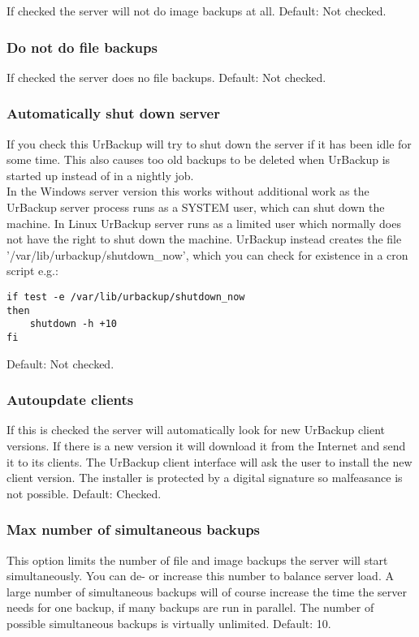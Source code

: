 \documentclass[a4paper,10pt]{article} \usepackage[breaklinks=true]{hyperref}
\begin{document}
If checked the server will not do image backups at all. Default: Not checked.

\subsubsection{Do not do file backups}

If checked the server does no file backups. Default: Not checked.

\subsubsection{Automatically shut down server}

If you check this UrBackup will try to shut down the server if it has been idle for some time. This also causes too old backups to be deleted when UrBackup is started up instead of in a nightly job.\\
In the Windows server version this works without additional work as the UrBackup
server process runs as a SYSTEM user, which can shut down the machine. In Linux
UrBackup server runs as a limited user which normally does not have the right to
shut down the machine. UrBackup instead creates the file
'/var/lib/urbackup/shutdown\_now', which you can check for existence in a cron
script e.g.:
\begin{verbatim}
if test -e /var/lib/urbackup/shutdown_now
then
	shutdown -h +10
fi
\end{verbatim}

Default: Not checked.

\subsubsection{Autoupdate clients}

If this is checked the server will automatically look for new UrBackup client
versions. If there is a new version it will download it from the Internet and
send it to its clients. The UrBackup client interface will ask the user to
install the new client version. The installer is protected by a digital
signature so malfeasance is not possible. Default: Checked.

\subsubsection{Max number of simultaneous backups}

This option limits the number of file and image backups the server will start
simultaneously. You can de- or increase this number to balance server load. A
large number of simultaneous backups will of course increase the time the server
needs for one backup, if many backups are run in parallel. The number of
possible simultaneous backups is virtually unlimited. Default: 10.
\end{document}
